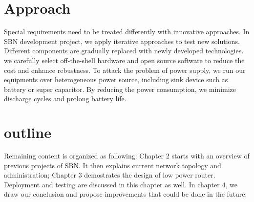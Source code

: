 \section{Approach}
Special requirements need to be treated differently with innovative approaches. In SBN development project, we apply iterative approaches to test new solutions. Different components are gradually replaced with newly developed technologies. we carefully select off-the-shell hardware and open source software to reduce the cost and enhance rebustness. To attack the problem of power supply, we run our equipments over heterogeneous power source, including sink device such as battery or super capacitor. By reducing the power consumption, we minimize discharge cycles and prolong battery life.

\section{outline}
Remaining content is organized as following: Chapter 2 starts with an overview of previous projects of SBN. It then explains current network topology and administration; Chapter 3 demostrates the design of low power router. Deployment and testing are discussed in this chapter as well. In chapter 4, we draw our conclusion and propose improvements that could be done in the future.
